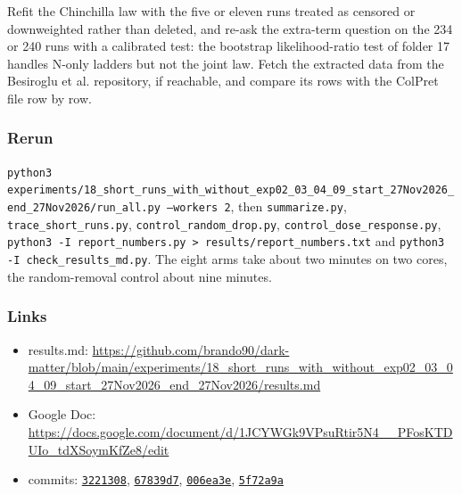 Refit the Chinchilla law with the five or eleven runs treated as censored or downweighted rather than deleted, and re-ask the extra-term question on the 234 or 240 runs with a calibrated test: the bootstrap likelihood-ratio test of folder 17 handles N-only ladders but not the joint law. Fetch the extracted data from the Besiroglu et al. repository, if reachable, and compare its rows with the ColPret file row by row.

\subsubsection*{Rerun}

\texttt{python3 experiments/\allowbreak{}18\_\allowbreak{}short\_\allowbreak{}runs\_\allowbreak{}with\_\allowbreak{}without\_\allowbreak{}exp02\_\allowbreak{}03\_\allowbreak{}04\_\allowbreak{}09\_\allowbreak{}start\_\allowbreak{}27Nov2026\_\allowbreak{}end\_\allowbreak{}27Nov2026/\allowbreak{}run\_\allowbreak{}all.py --workers 2}, then \texttt{summarize.py}, \texttt{trace\_\allowbreak{}short\_\allowbreak{}runs.py}, \texttt{control\_\allowbreak{}random\_\allowbreak{}drop.py}, \texttt{control\_\allowbreak{}dose\_\allowbreak{}response.py}, \texttt{python3 -I report\_\allowbreak{}numbers.py > results/\allowbreak{}report\_\allowbreak{}numbers.txt} and \texttt{python3 -I check\_\allowbreak{}results\_\allowbreak{}md.py}. The eight arms take about two minutes on two cores, the random-removal control about nine minutes.

\subsubsection*{Links}
\begin{itemize}\raggedright
  \item results.md: \url{https://github.com/brando90/dark-matter/blob/main/experiments/18_short_runs_with_without_exp02_03_04_09_start_27Nov2026_end_27Nov2026/results.md}
  \item Google Doc: \url{https://docs.google.com/document/d/1JCYWGk9VPsuRtir5N4__PFosKTDUIo_tdXSoymKfZe8/edit}
  \item commits: \href{https://github.com/brando90/dark-matter/commit/3221308}{\texttt{3221308}}, \href{https://github.com/brando90/dark-matter/commit/67839d7}{\texttt{67839d7}}, \href{https://github.com/brando90/dark-matter/commit/006ea3e}{\texttt{006ea3e}}, \href{https://github.com/brando90/dark-matter/commit/5f72a9a}{\texttt{5f72a9a}}
\end{itemize}
